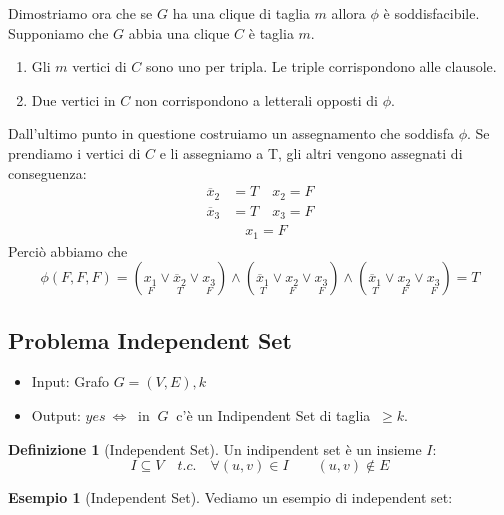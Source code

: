 \documentclass[a4paper]{article}
\theoremstyle{definition}
\newtheorem{esempio}{Esempio}[subsection]
\newtheorem{definit}{Definizione}[subsection]
\begin{document}
		Dimostriamo ora che se $ G $ ha una clique di taglia $ m $ allora $ \phi $ è soddisfacibile. Supponiamo che $ G $ abbia una clique $ C $ è taglia $ m $.
		\begin{enumerate}
			\item Gli $ m $ vertici di $ C $ sono uno per tripla. Le triple corrispondono alle clausole.
			\item Due vertici in $ C $ non corrispondono a letterali opposti di $ \phi $.
		\end{enumerate}
		Dall'ultimo punto in questione costruiamo un assegnamento che soddisfa $ \phi $. Se prendiamo i vertici di $ C $ e li assegniamo a T, gli altri vengono assegnati di conseguenza:
		\begin{align*}
			\overline{x}_2 &= T \quad x_2 = F \\
			\overline{x}_3 &= T	\quad x_3 = F \\
						   &    \quad x_1 = F 
		\end{align*}
		Perciò abbiamo che
		\[
			\phi(F,F,F) =
			(\underset{F}{x_1} \vee \underset{T}{\overline{x}_2}\vee \underset{F}{x_3}) 
			\wedge (\underset{T}{\overline{x}_1}\vee \underset{F}{x_2} \vee \underset{F}{x_3}) 
			\wedge (\underset{T}{\overline{x}_1}\vee \underset{F}{x_2} \vee \underset{F}{x_3}) = T
		\]
		
	\subsection{Problema Independent Set}
		\begin{itemize}
			\item Input: Grafo $ G = (V, E), k $
			\item Output: $ yes\ \Leftrightarrow\  $ in $\ G\ $ c'è un Indipendent Set di taglia $\ \geq k $.
		\end{itemize}
		\begin{definit}[Independent Set]
			Un indipendent set è un insieme $ I $:
			\[
				I\subseteq V\quad t.c.\quad \forall (u,v)\in I\qquad (u,v)\notin E
			\]
			
		\end{definit}
		\begin{esempio}[Independent Set]
			Vediamo un esempio di independent set:\\
			\begin{figure}[h!]
				\centering
			\end{figure}
		\end{esempio}
		
\end{document}
